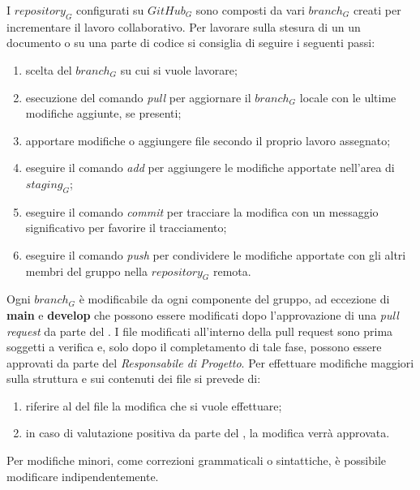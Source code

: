 I $repository_G$ configurati su $GitHub_G$ sono composti da vari $branch_G$ creati per incrementare il lavoro collaborativo. Per lavorare sulla stesura di un un documento o su una parte di codice si consiglia di seguire i seguenti passi:
\begin{enumerate}
	\item scelta del $branch_G$ su cui si vuole lavorare;
	\item esecuzione del comando \textit{pull} per aggiornare il $branch_G$ locale con le ultime modifiche aggiunte, se presenti;
	\item apportare modifiche o aggiungere file secondo il proprio lavoro assegnato;
	\item eseguire il comando \textit{add} per aggiungere le modifiche apportate nell'area di $staging_G$;
	\item eseguire il comando \textit{commit} per tracciare la modifica con un messaggio significativo per favorire il tracciamento;
	\item eseguire il comando \textit{push} per condividere le modifiche apportate con gli altri membri del gruppo nella $repository_G$ remota.
\end{enumerate}

Ogni $branch_G$ è modificabile da ogni componente del gruppo, ad eccezione di \textbf{main} e \textbf{develop} che possono essere modificati dopo l'approvazione di una \textit{pull request} da parte del \respProg. I file modificati all'interno della pull request sono prima soggetti a verifica e, solo dopo il completamento di tale fase, possono essere approvati da parte del \textit{Responsabile di Progetto}.
Per effettuare modifiche maggiori sulla struttura e sui contenuti dei file si prevede di:
\begin{enumerate}
	\item riferire al \respProg del file la modifica che si vuole effettuare;
	\item in caso di valutazione positiva da parte del \respProg, la modifica verrà approvata.
\end{enumerate}
Per modifiche minori, come correzioni grammaticali o sintattiche, è possibile modificare indipendentemente. 



